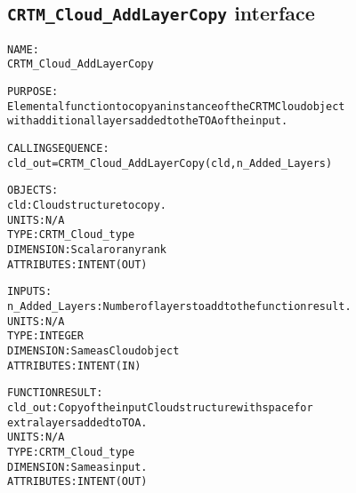 \subsection{\texttt{CRTM\_Cloud\_AddLayerCopy} interface}
  \label{sec:CRTM_Cloud_AddLayerCopy_interface}
  \begin{alltt}
 
  NAME:
        CRTM_Cloud_AddLayerCopy
  
  PURPOSE:
        Elemental function to copy an instance of the CRTM Cloud object
        with additional layers added to the TOA of the input.
 
  CALLING SEQUENCE:
        cld_out = CRTM_Cloud_AddLayerCopy( cld, n_Added_Layers )
 
  OBJECTS:
        cld:             Cloud structure to copy.
                         UNITS:      N/A
                         TYPE:       CRTM_Cloud_type
                         DIMENSION:  Scalar or any rank
                         ATTRIBUTES: INTENT(OUT)
 
  INPUTS:
        n_Added_Layers:  Number of layers to add to the function result.
                         UNITS:      N/A
                         TYPE:       INTEGER
                         DIMENSION:  Same as Cloud object
                         ATTRIBUTES: INTENT(IN)
 
  FUNCTION RESULT:
        cld_out:         Copy of the input Cloud structure with space for
                         extra layers added to TOA.
                         UNITS:      N/A
                         TYPE:       CRTM_Cloud_type
                         DIMENSION:  Same as input.
                         ATTRIBUTES: INTENT(OUT)
 
 
  \end{alltt}
